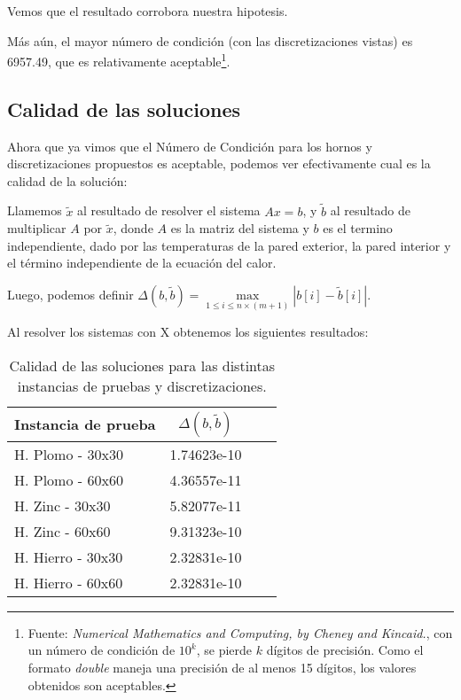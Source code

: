 Vemos que el resultado corrobora nuestra hipotesis.

Más aún, el mayor número de condición (con las discretizaciones vistas) es 6957.49, que es relativamente aceptable\footnote{Fuente: \textit{Numerical Mathematics and Computing, by Cheney and Kincaid.}, con un número de condición de $10^k$, se pierde $k$ dígitos de precisión. Como el formato \textit{double} maneja una precisión de al menos 15 dígitos, los valores obtenidos son aceptables.}.

\subsection{Calidad de las soluciones}

Ahora que ya vimos que el Número de Condición para los hornos y discretizaciones propuestos es aceptable, podemos ver efectivamente cual es la calidad de la solución:

Llamemos $\tilde{x}$ al resultado de resolver el sistema $Ax = b$, y $\tilde{b}$ al resultado de multiplicar $A$ por $\tilde{x}$, donde $A$ es la matriz del sistema y $b$ es el termino independiente, dado por las temperaturas de la pared exterior, la pared interior y el término independiente de la ecuación del calor.

\medskip

Luego, podemos definir $\Delta(b, \tilde{b}) = \max\limits_{1 \leq i \leq n\times(m+1)}|b[i] - \tilde{b}[i]|$.

Al resolver los sistemas con X obtenemos los siguientes resultados:

\begin{table}[H]
    \begin{center}
        \begin{tabular}{| l | c | c | c |}
            \hline
            Instancia de prueba & $\Delta(b, \tilde{b})$ \\ \hline
            H. Plomo - 30x30    & 1.74623e-10            \\
            H. Plomo - 60x60    & 4.36557e-11            \\
            H. Zinc - 30x30     & 5.82077e-11            \\
            H. Zinc - 60x60     & 9.31323e-10            \\
            H. Hierro - 30x30   & 2.32831e-10            \\
            H. Hierro - 60x60   & 2.32831e-10            \\
            \hline
        \end{tabular}
        \captionsetup{justification=centering}
        \caption{Calidad de las soluciones para las distintas instancias de pruebas y discretizaciones.}
    \end{center}
\end{table}

